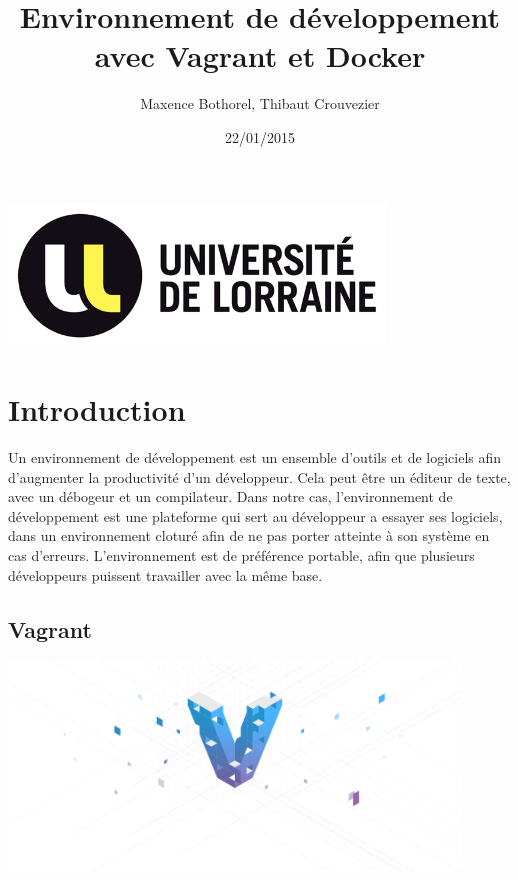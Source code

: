 \documentclass[12pt,a4paper]{article}
\title{Environnement de développement avec Vagrant et Docker}
\author{Maxence Bothorel, Thibaut Crouvezier}
\date{22/01/2015}
\begin{document}
\maketitle{}

\begin{center}
\includegraphics[width=10cm]{images_rapport/univ_logo.jpg}
\end{center}

\newpage{}

\tableofcontents{}

\newpage{}

\section{Introduction}
Un environnement de développement est un ensemble d'outils et de logiciels afin d'augmenter la productivité d'un développeur. Cela peut être un éditeur de texte, avec un débogeur et un compilateur. Dans notre cas, l'environnement de développement est une plateforme qui sert au développeur a essayer ses logiciels, dans un environnement cloturé afin de ne pas porter atteinte à son système en cas d'erreurs. L'environnement est de préférence portable, afin que plusieurs développeurs puissent travailler avec la même base.

\subsection{Vagrant}
\begin{center}
\includegraphics[width=12cm]{images_rapport/vagrant_logo.jpg}
\end{center}
\end{document}
